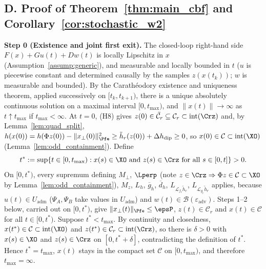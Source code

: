 \subsection*{D. Proof of Theorem~\ref{thm:main_cbf} and Corollary~\ref{cor:stochastic_w2}}
\textbf{Step 0 (Existence and joint first exit).} The closed-loop right-hand side \(F(x) + Gu(t) + Dw(t)\) is locally Lipschitz in \(x\) (Assumption~\ref{assump:generic}), and measurable and locally bounded in \(t\) (\(u\) is piecewise constant and determined causally by the samples \(z(x(t_k))\); \(w\) is measurable and bounded). By the Carath\'eodory existence and uniqueness theorem, applied successively on \([t_k, t_{k+1})\), there is a unique absolutely continuous solution on a maximal interval \([0, t_{\max})\), and \(\|x(t)\| \to \infty\) as \(t \uparrow t_{\max}\) if \(t_{\max} < \infty\). At \(t = 0\), (H8) gives \(z(0) \in \tilde{\mathcal{C}}_r \subseteq \mathcal{C}_r \subset \mathrm{int}(\Crz)\) and, by Lemma~\ref{lem:quad_split}, \(h(x(0)) = h(\Phi z(0)) - \|x_\perp(0)\|_{\Pfe}^2 \ge \tilde h_r(z(0)) + \Delta h_{\mathrm{dip}} \ge 0\), so \(x(0) \in \mathcal{C} \subset \mathrm{int}(\XO)\) (Lemma~\ref{lem:odd_containment}). Define
\[
t^* := \sup\{t \in [0, t_{\max}) : x(s) \in \XO \text{ and } z(s) \in \Crz \text{ for all } s \in [0, t]\} > 0 .
\]
On \([0, t^*)\), every supremum defining \(M_\perp\), \(\Lperp\) (note \(z \in \Crz \Rightarrow \Phi z \in \mathcal{C} \subset \XO\) by Lemma~\ref{lem:odd_containment}), \(M_z\), \(L_h\), \(\overline g_h\), \(\overline d_h\), \(L_{\mathcal{L}_{f_r}\tilde h_r}\), \(L_{\mathcal{L}_{g_r}\tilde h_r}\) applies, because \(u(t) \in U_{\mathrm{adm}}\) (\(\Psi_A, \Psi_B\) take values in \(U_{\mathrm{adm}}\)) and \(w(t) \in \mathcal{B}(\varepsilon_{\mathrm{adv}})\). Steps 1--2 below, carried out on \([0, t^*)\), give \(\|x_\perp(t)\|_{\Pfe} \le \epsP\), \(z(t) \in \mathcal{C}_r\) and \(x(t) \in \mathcal{C}\) for all \(t \in [0,t^*)\). Suppose \(t^* < t_{\max}\). By continuity and closedness, \(x(t^*) \in \mathcal{C} \subset \mathrm{int}(\XO)\) and \(z(t^*) \in \mathcal{C}_r \subset \mathrm{int}(\Crz)\), so there is \(\delta > 0\) with \(x(s) \in \XO\) and \(z(s) \in \Crz\) on \([0, t^* + \delta]\), contradicting the definition of \(t^*\). Hence \(t^* = t_{\max}\), \(x(t)\) stays in the compact set \(\mathcal{C}\) on \([0, t_{\max})\), and therefore \(t_{\max} = \infty\).

